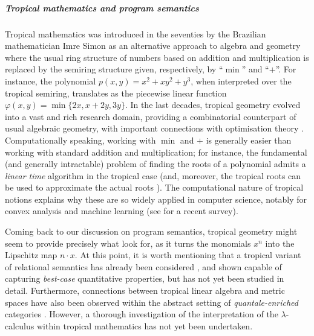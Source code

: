 \subparagraph*{Tropical mathematics and program semantics } 

Tropical mathematics was introduced in the seventies by the Brazilian mathematician Imre Simon \cite{Simon} as an alternative approach to algebra and geometry where the usual ring structure of numbers based on addition and multiplication is replaced by the semiring structure given, respectively, by ``$\min$'' and ``$+$''.
%
%
For instance, the polynomial $p(x,y)=x^{2}+xy^{2}+y^{3}$, when interpreted over the tropical semiring, translates as the piecewise linear function
$
\varphi(x,y)=\min\{2x, x+2y, 3y\}
$.
In the last decades, tropical geometry evolved into a vast and rich research domain, providing a combinatorial counterpart of usual algebraic geometry, with important connections with optimisation theory \cite{Sturmfelds}.
Computationally speaking, working with $\min$ and $+$ is generally easier than working with standard addition and multiplication; for instance, the fundamental (and generally intractable) problem of finding the roots of a polynomial admits a \emph{linear time} algorithm in the tropical case (and, moreover,  the tropical roots can be used to approximate the actual roots \cite{Noferini2015}).
The computational nature of tropical notions explains why these are so widely applied in computer science, notably for convex analysis and machine learning (see \cite{Maragos2021} for a recent survey).


Coming back to our discussion on program semantics, tropical geometry might seem to provide precisely what look for, as it turns the monomials $x^{n}$ into the Lipschitz map  $n\cdot x$.
At this point, it is worth mentioning that a tropical variant of relational semantics has already been considered \cite{Manzo2013}, and shown capable of capturing \emph{best-case} quantitative properties, but has not yet been studied in detail. Furthermore, connections between tropical linear algebra and metric spaces have also been observed \cite{Fuji} within the abstract setting of \emph{quantale-enriched} categories \cite{Hofmann2014, Stubbe2014}.
However, a thorough investigation of the interpretation of the $\lambda$-calculus within tropical mathematics has not yet been undertaken. 


